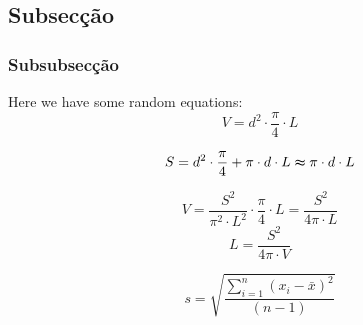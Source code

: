 \subsection{Subsecção}
\subsubsection{Subsubsecção}\label{subsub}
Here we have some random equations: 
\begin{equation}\label{Volume}
V = d^2\cdot \frac{\pi}{4}\cdot L
\end{equation}

\begin{equation}\label{Surface}
S = d^2 \cdot \frac{\pi}{4} + \pi \cdot d \cdot L \thickapprox \pi \cdot d \cdot L
\end{equation}

\begin{equation}\label{Volume1}
V = \frac{S^2}{\pi ^2 \cdot L^2} \cdot \frac{\pi}{4}\cdot L = \frac{S^2}{4\pi \cdot L}
\end{equation}
\begin{equation}\label{Length}
L = \frac{S^2}{4\pi \cdot V}
\end{equation}

\begin{equation}\label{stdv}
 s = \sqrt{\frac{\sum_{i=1}^n (x_i-\bar{x})^2}{(n-1)}}
\end{equation}



